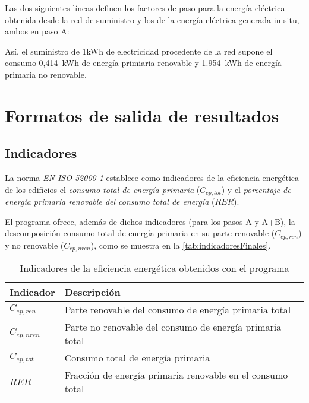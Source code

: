\documentclass[10pt,notitlepage,oneside,a4paper]{article}
\begin{document}
Las dos siguientes líneas definen los factores de paso para la energía eléctrica obtenida desde la red de suministro y los de la energía eléctrica generada in situ, ambos en paso A:



Así, el suministro de 1kWh de electricidad procedente de la red supone el consumo 0,414~kWh de energía primiaria renovable y 1.954~kWh de energía primaria no renovable.

\clearpage
\newpage
\section{Formatos de salida de resultados}\label{sec:formatosalida}

\subsection{Indicadores}

La norma \textit{EN ISO 52000-1} establece como indicadores de la eficiencia energética de los edificios el \textit{consumo total de energía primaria} (\texttt{$C_{ep,tot}$}) y el \textit{porcentaje de energía primaria renovable del consumo total de energía} (\texttt{$RER$}).

El programa ofrece, además de dichos indicadores (para los pasos A y A+B), la descomposición consumo total de energía primaria en su parte renovable (\texttt{$C_{ep,ren}$}) y no renovable (\texttt{$C_{ep,nren}$}), como se muestra en la \autoref{tab:indicadoresFinales}.

\begin{table}[H]
\centering
\small
\caption{Indicadores de la eficiencia energética obtenidos con el programa}\label{tab:indicadoresFinales}
\begin{tabular}{ll}
    \toprule
    \textbf{Indicador} & \textbf{Descripción}\\
    \midrule
    $C_{ep,ren}$ & Parte renovable del consumo de energía primaria total\\
    $C_{ep,nren}$& Parte no renovable del consumo de energía primaria total\\
    $C_{ep,tot}$ & Consumo total de energía primaria\\
    $RER$      & Fracción de energía primaria renovable en el consumo total\\
    \bottomrule
\end{tabular}
\end{table}
\end{document}
